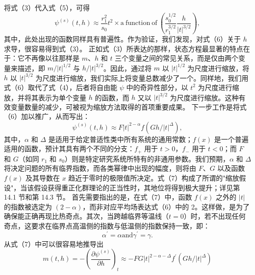 将式（3）代入式（5），可得
\begin{equation}\tag{12.10.5}\label{eq:12.10.5}
\psi ^{( s )} ( t , h ) \approx \frac { r _ { 1 } ^{2} } { s _ { 0 } } t ^{2} \times \mathrm { a ~ f u n c t i o n ~ o f ~ } \left( \frac { s _ { 0 } ^{1 / 2} } { r _ { 1 } ^{3 / 2} } \frac { h } { | t | ^{3 / 2} } \right) ,
\end{equation}
其中，此处出现的函数同样具有普遍性。作为验证，我们发现，对式（6）关于 \(h\) 求导，很容易得到式（3）。
正如式（3）所表达的那样，状态方程最显著的特点在于：它不再像以往那样是 \(m\)、\(h\) 和 \(t\) 三个变量之间的常见关系，而是仅由两个变量来描述，即 \(m/|t|^{1/2}\) 与 \(h/|t|^{3/2}\)。因此，通过将 \(m\) 以 \(|t|^{1/2}\) 为尺度进行缩放，将 \(h\) 以 \(|t|^{3/2}\) 为尺度进行缩放，我们实际上将变量总数减少了一个。同样地，我们用式（6）取代了式（4），后者将自由能 \(\psi\) 中的奇异性部分，以 \(t^2\) 为尺度进行缩放，并将其表示为单个变量 \(h\) 的函数，而 \(h\) 又以 \(|t|^{3/2}\) 为尺度进行缩放。这种有效变量数量的减少，可被视为缩放方法取得的首项重要成果。
下一步工作是将式（6）加以推广，从而写出：
\begin{equation}\tag{12.10.6}\label{eq:12.10.6}
\psi ^{( s )} ( t , h ) \approx F | t | ^{2 - \alpha} f ( G h / | t | ^{\Delta} ) ,
\end{equation}
其中，\(\alpha\) 和 \(\Delta\) 是适用于给定普适性类中所有系统的通用常数；\(f(x)\) 是一个普遍适用的函数，预计其具有两个不同的分支：\(f_{+}\) 用于 \(t > 0\)，\(f_{-}\) 用于 \(t < 0\)；而 \(F\) 和 \(G\)（如同 \(r_{1}\) 和 \(s_{0}\)）则是特定研究系统所特有的非通用参数。我们预期，\(\alpha\) 和 \(\Delta\) 将决定问题的所有临界指数，而各类幂律中出现的幅度，则将由 \(F\)、\(G\) 以及函数 \(f(x)\) 及其导数在 \(x\) 趋近于零时的极限值所决定。式（7）构成了所谓的"缩放假设"，当该假设获得重正化群理论的正当性时，其地位将得到极大提升；详见第 14.1 节和第 14.3 节。
首先需要指出的是，在式（7）中，函数 \(f(x)\) 之外的 \(|t|\) 的指数被选定为 \((2-\alpha)\)，而非对应平均场表达式（6）中的 2。这样做，是为了确保能正确再现比热奇点。其次，当跨越临界等温线（\(t=0\)）时，若不出现任何奇点，这要求在临界点高温侧的指数与低温侧的指数保持一致，即：
\begin{equation}\tag{12.10.7}\label{eq:12.10.7}
\alpha ^{\prime} = \alpha  \mathrm { a n d }  \gamma ^{\prime} = \gamma .
\end{equation}
从式（7）中可以很容易地推导出
\begin{equation}\tag{12.10.8}\label{eq:12.10.8}
m ( t , h ) = - \left( \frac { \partial \psi ^{( s )} } { \partial h } \right) _ { t } \approx - F G | t | ^{2 - \alpha - \Delta} f ^{\prime} ( G h / | t | ^{\Delta} )
\end{equation}
